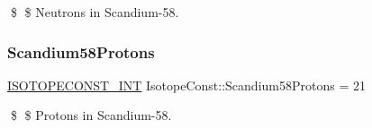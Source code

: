 \$ \$ Neutrons in Scandium-\/58. \mbox{\label{group___isotope_const-_scandium-_sc58_gaa1b7ccdd67b8484ae8379210e18ae095}} 
\subsubsection{\texorpdfstring{Scandium58\+Protons}{Scandium58Protons}}
{\footnotesize\ttfamily \mbox{\hyperlink{group___isotope_const-_macros_ga5f18360b3e99483a35c32d789e62621c}{I\+S\+O\+T\+O\+P\+E\+C\+O\+N\+S\+T\+\_\+\+I\+NT}} Isotope\+Const\+::\+Scandium58\+Protons = 21}

\$ \$ Protons in Scandium-\/58. 